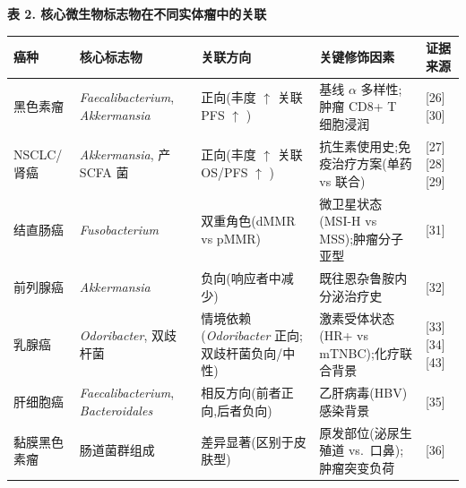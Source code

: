 \documentclass[11pt]{article}
\newcounter{none}
\begin{document}
\textbf{表 2. 核心微生物标志物在不同实体瘤中的关联}

{\def\LTcaptype{none} %
\begin{longtable}[]{@{}
  >{\raggedright\arraybackslash}p{}
  >{\raggedright\arraybackslash}p{}
  >{\raggedright\arraybackslash}p{}
  >{\raggedright\arraybackslash}p{}
  >{\raggedright\arraybackslash}p{}@{}}
\toprule\noalign{}
\begin{minipage}[b]{\linewidth}\raggedright
癌种
\end{minipage} & \begin{minipage}[b]{\linewidth}\raggedright
核心标志物
\end{minipage} & \begin{minipage}[b]{\linewidth}\raggedright
关联方向
\end{minipage} & \begin{minipage}[b]{\linewidth}\raggedright
关键修饰因素
\end{minipage} & \begin{minipage}[b]{\linewidth}\raggedright
证据来源
\end{minipage} \\
\midrule\noalign{}
\endhead
\bottomrule\noalign{}
\endlastfoot
黑色素瘤 & \emph{Faecalibacterium}, \emph{Akkermansia} & 正向(丰度 \(\uparrow\) 关联 PFS \(\uparrow\) ) & 基线 \(\alpha\) 多样性;肿瘤 CD8+ T 细胞浸润 & {[}26{]}{[}30{]} \\
NSCLC/肾癌 & \emph{Akkermansia}, 产 SCFA 菌 & 正向(丰度 \(\uparrow\) 关联 OS/PFS \(\uparrow\) ) & 抗生素使用史;免疫治疗方案(单药 vs 联合) & {[}27{]}{[}28{]}{[}29{]} \\
结直肠癌 & \emph{Fusobacterium} & 双重角色(dMMR vs pMMR) & 微卫星状态(MSI-H vs MSS);肿瘤分子亚型 & {[}31{]} \\
前列腺癌 & \emph{Akkermansia} & 负向(响应者中减少) & 既往恩杂鲁胺内分泌治疗史 & {[}32{]} \\
乳腺癌 & \emph{Odoribacter}, 双歧杆菌 & 情境依赖(\emph{Odoribacter} 正向;双歧杆菌负向/中性) & 激素受体状态(HR+ vs mTNBC);化疗联合背景 & {[}33{]}{[}34{]}{[}43{]} \\
肝细胞癌 & \emph{Faecalibacterium}, \emph{Bacteroidales} & 相反方向(前者正向,后者负向) & 乙肝病毒(HBV)感染背景 & {[}35{]} \\
黏膜黑色素瘤 & 肠道菌群组成 & 差异显著(区别于皮肤型) & 原发部位(泌尿生殖道 vs.~口鼻);肿瘤突变负荷 & {[}36{]} \\
\end{longtable}
}
\end{document}
